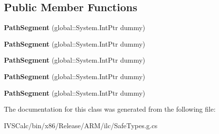 \subsection*{Public Member Functions}
\begin{DoxyCompactItemize}
\item 
\mbox{\label{class_windows_1_1_u_i_1_1_xaml_1_1_media_1_1_path_segment_a6bd41dd96a3b8184c41b9c09468dbf85}} 
{\bfseries Path\+Segment} (global\+::\+System.\+Int\+Ptr dummy)
\item 
\mbox{\label{class_windows_1_1_u_i_1_1_xaml_1_1_media_1_1_path_segment_a6bd41dd96a3b8184c41b9c09468dbf85}} 
{\bfseries Path\+Segment} (global\+::\+System.\+Int\+Ptr dummy)
\item 
\mbox{\label{class_windows_1_1_u_i_1_1_xaml_1_1_media_1_1_path_segment_a6bd41dd96a3b8184c41b9c09468dbf85}} 
{\bfseries Path\+Segment} (global\+::\+System.\+Int\+Ptr dummy)
\item 
\mbox{\label{class_windows_1_1_u_i_1_1_xaml_1_1_media_1_1_path_segment_a6bd41dd96a3b8184c41b9c09468dbf85}} 
{\bfseries Path\+Segment} (global\+::\+System.\+Int\+Ptr dummy)
\item 
\mbox{\label{class_windows_1_1_u_i_1_1_xaml_1_1_media_1_1_path_segment_a6bd41dd96a3b8184c41b9c09468dbf85}} 
{\bfseries Path\+Segment} (global\+::\+System.\+Int\+Ptr dummy)
\end{DoxyCompactItemize}


The documentation for this class was generated from the following file\+:\begin{DoxyCompactItemize}
\item 
I\+V\+S\+Calc/bin/x86/\+Release/\+A\+R\+M/ilc/Safe\+Types.\+g.\+cs\end{DoxyCompactItemize}
